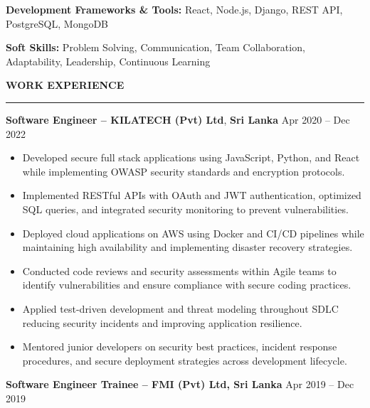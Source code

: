 \documentclass[10pt,letterpaper]{article}
\begin{document}
\textbf{Development Frameworks \& Tools:} React, Node.js, Django, REST API, PostgreSQL, MongoDB

\textbf{Soft Skills:} Problem Solving, Communication, Team Collaboration, Adaptability, Leadership, Continuous Learning

\vspace{8pt}

\textbf{WORK EXPERIENCE}\\[-8pt]
\noindent\rule{\textwidth}{1pt}

\vspace{-2pt}

\textbf{Software Engineer -- KILATECH (Pvt) Ltd}, \textbf{Sri Lanka} \hfill Apr 2020 -- Dec 2022

\vspace{-1pt}

\begin{itemize}
\item Developed secure full stack applications using JavaScript, Python, and React while implementing OWASP security standards and encryption protocols.
\item Implemented RESTful APIs with OAuth and JWT authentication, optimized SQL queries, and integrated security monitoring to prevent vulnerabilities.
\item Deployed cloud applications on AWS using Docker and CI/CD pipelines while maintaining high availability and implementing disaster recovery strategies.
\item Conducted code reviews and security assessments within Agile teams to identify vulnerabilities and ensure compliance with secure coding practices.
\item Applied test-driven development and threat modeling throughout SDLC reducing security incidents and improving application resilience.
\item Mentored junior developers on security best practices, incident response procedures, and secure deployment strategies across development lifecycle.
\end{itemize}

\textbf{Software Engineer Trainee -- FMI (Pvt) Ltd, Sri Lanka} \hfill Apr 2019 -- Dec 2019

\vspace{-1pt}
\end{document}
